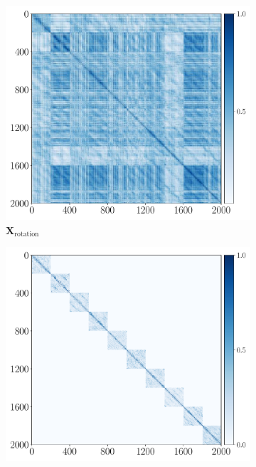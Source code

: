 \documentclass[../../book-main.tex]{subfiles}
\begin{document}
\begin{example}
\begin{figure}[t]
    \begin{subfigure}[t]{0.3\textwidth}
        \centering
        \includegraphics[width=\textwidth]{figs_chap4/mnist1d-heatmap-X_translate_train_all.pdf}
        \caption{$\bm{X}_{\text{rotation}}$}
    \end{subfigure}
    \hfill
    \begin{subfigure}[t]{0.3\textwidth}
        \centering
        \includegraphics[width=\textwidth]{figs_chap4/mnist1d-heatmap-Z_translate_train_all.pdf}

\end{subfigure}
\end{figure}
\end{example}
\end{document}
